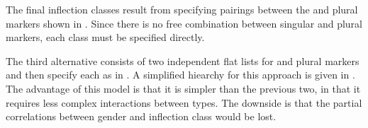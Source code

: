 \begin{figure}
{}
\end{figure}

The final inflection classes result from specifying pairings between the  and plural markers shown in . Since there is no free combination between singular and plural markers, each class must be specified directly.

\largerpage 
The third alternative consists of two independent flat lists for  and plural markers and then specify each  as in . A simplified hiearchy for this approach is given in . The advantage of this model is that it is simpler than the previous two, in that it requires less complex interactions between types. The downside is that the partial correlations between gender and inflection class would be lost.

